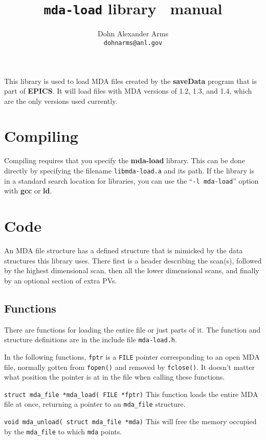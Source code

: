 \documentclass[10pt,letterpaper]{article}
\title{ \vspace{-5ex} \texttt{mda-load} library \version\ manual}
\author{Dohn Alexander Arms \\ \texttt{dohnarms@anl.gov}}
\begin{document}
\maketitle


This library is used to load MDA files created by the
\textbf{saveData} program that is part of \textbf{EPICS}.
It will load files with MDA versions of 1.2, 1.3, and 1.4,
which are the only versions used currently.


\section{Compiling}

Compiling requires that you specify the \textbf{mda-load} library.
This can be done directly by specifying the filename
\verb+libmda-load.a+ and its path. If the library is in a standard
search location for libraries, you can use the ``\verb+-l mda-load+''
option with \textbf{gcc} or \textbf{ld}.


\section{Code}

An MDA file structure has a defined structure that is mimicked by the
data structures this library uses.  There first is a header describing
the scan(s), followed by the highest dimensional scan, then all the
lower dimensional scans, and finally by an optional section of extra
PVs.


\subsection{Functions}

There are functions for loading the entire file or just parts of it.
The function and structure definitions are in the include file
\verb+mda-load.h+.

In the following functions, \verb+fptr+ is a \verb+FILE+ pointer
corresponding to an open MDA file, normally gotten from \verb+fopen()+
and removed by \verb+fclose()+.  It doesn't matter what position the
pointer is at in the file when calling these functions.

\vspace{1.5ex}
\noindent
\verb+struct mda_file *mda_load( FILE *fptr)+ \linebreak
This function loads the entire MDA file at once, returning a pointer
to an \verb+mda_file+ structure.

\vspace{1.5ex}
\noindent
\verb+void mda_unload( struct mda_file *mda)+ \linebreak 
This will free the memory occupied by the \verb+mda_file+ to which
\verb+mda+ points.
\end{document}
